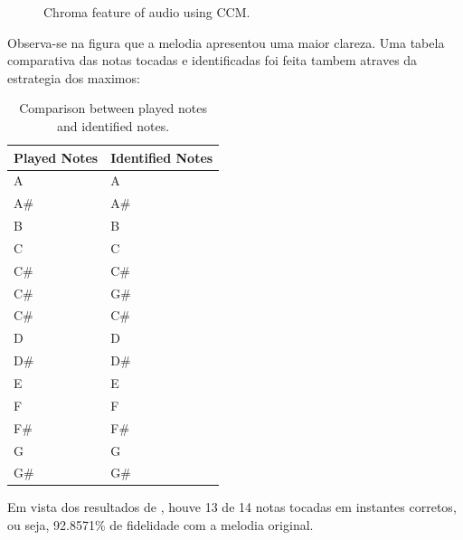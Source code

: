 \documentclass{article}
\begin{document}
	\begin{figure}[h]
	 \centerline{}
	 \caption{Chroma feature of audio using CCM.}
	 \label{fig:1-ccm}
	\end{figure}	


	Observa-se na figura  que a melodia apresentou uma maior clareza. Uma tabela comparativa das notas tocadas e identificadas foi feita tambem atraves da estrategia dos maximos:

	\begin{table}[h]
	 \begin{center}
	 \begin{tabular}{|l|l|}
	  \hline
	  Played Notes & Identified Notes \\
	  \hline
	  A  & A \\
	  A\#  & A\# \\
	  B  & B \\
	  C  & C \\
	  C\#  & C\# \\
	  C\#  & G\# \\
	  C\#  & C\# \\
	  D  & D \\
	  D\#  & D\# \\
	  E  & E \\
	  F  & F \\
	  F\#  & F\# \\
	  G  & G \\
	  G\#  & G\# \\
	  \hline
	 \end{tabular}
	\end{center}
	 \caption{Comparison between played notes and identified notes.}
	 \label{tab:table-1-ccm}
	\end{table}

	\newpage
	Em vista dos resultados de , houve 13 de 14 notas tocadas em instantes corretos, ou seja, 92.8571\% de fidelidade com a melodia original.
\end{document}
